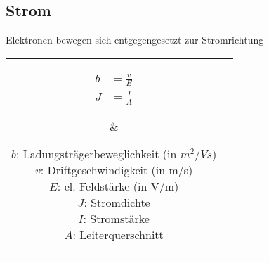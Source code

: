 \begin{sectionbox}
	\subsection{Strom}
	Elektronen bewegen sich entgegengesetzt zur Stromrichtung

	\begin{tabular}{cc}
	\parbox{1cm}{
		\begin{emphbox}
			\begin{align*}
				b &= \frac{v}{E} \\
				J &= \frac{I}{A}
			\end{align*}
		\end{emphbox}
	} & 
	
	\parbox{5cm}{
		\begin{symbolbox}
			$b$: Ladungsträgerbeweglichkeit (in $m^2/Vs$) \\
			$v$: Driftgeschwindigkeit (in m/s) \\
			$E$: el. Feldstärke (in V/m) \\
			$J$: Stromdichte \\
			$I$: Stromstärke \\
			$A$: Leiterquerschnitt
		\end{symbolbox}
	}
\end{tabular}

\end{sectionbox}

